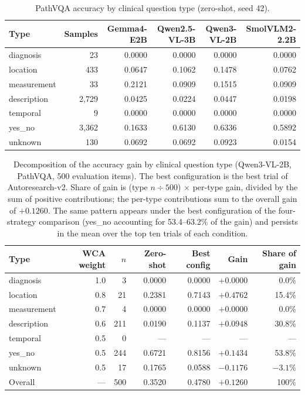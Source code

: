 \begin{table}[h]
\centering
\caption{PathVQA accuracy by clinical question type (zero-shot, seed 42).}
\label{tab:apptypes}
\small
\begin{tabular}{@{}lrrrrr@{}}
\toprule
Type & Samples & Gemma4-E2B & Qwen2.5-VL-3B & Qwen3-VL-2B & SmolVLM2-2.2B \\
\midrule
diagnosis   & 23    & 0.0000 & 0.0000 & 0.0000 & 0.0000 \\
location    & 433   & 0.0647 & 0.1062 & 0.1478 & 0.0762 \\
measurement & 33    & 0.2121 & 0.0909 & 0.1515 & 0.0909 \\
description & 2,729 & 0.0425 & 0.0224 & 0.0447 & 0.0198 \\
temporal    & 9     & 0.0000 & 0.0000 & 0.0000 & 0.0000 \\
yes\_no     & 3,362 & 0.1633 & 0.6130 & 0.6336 & 0.5892 \\
unknown     & 130   & 0.0692 & 0.0692 & 0.0923 & 0.0154 \\
\bottomrule
\end{tabular}
\end{table}

\begin{table}[h]
\centering
\caption{Decomposition of the accuracy gain by clinical question type
(Qwen3-VL-2B, PathVQA, 500 evaluation items). The best configuration is the best
trial of Autoresearch-v2. Share of gain is (type $n \div 500$) $\times$ per-type
gain, divided by the sum of positive contributions; the per-type contributions sum
to the overall gain of $+0.1260$. The same pattern appears under the best
configuration of the four-strategy comparison (yes\_no accounting for
53.4--63.2\% of the gain) and persists in the mean over the top ten trials of each
condition.}
\label{tab:appgain}
\small
\begin{tabular}{@{}lrrrrrr@{}}
\toprule
Type & WCA weight & $n$ & Zero-shot & Best config & Gain & Share of gain \\
\midrule
diagnosis   & 1.0 & 3   & 0.0000 & 0.0000 & $+0.0000$ & 0.0\% \\
location    & 0.8 & 21  & 0.2381 & 0.7143 & $+0.4762$ & 15.4\% \\
measurement & 0.7 & 4   & 0.0000 & 0.0000 & $+0.0000$ & 0.0\% \\
description & 0.6 & 211 & 0.0190 & 0.1137 & $+0.0948$ & 30.8\% \\
temporal    & 0.5 & 0   & ---    & ---    & ---       & --- \\
yes\_no     & 0.5 & 244 & 0.6721 & 0.8156 & $+0.1434$ & 53.8\% \\
unknown     & 0.5 & 17  & 0.1765 & 0.0588 & $-0.1176$ & $-3.1$\% \\
\midrule
Overall     & --- & 500 & 0.3520 & 0.4780 & $+0.1260$ & 100\% \\
\bottomrule
\end{tabular}
\end{table}

